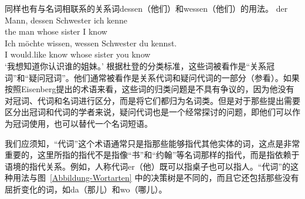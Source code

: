 同样也有与名词相联系的关系词dessen（他们）和wessen（他们）的用法。
\eal
\ex 
\gll der Mann, dessen Schwester ich kenne\\
	 the man whose sister I know\\
\ex 
\gll Ich möchte wissen, wessen Schwester du kennst.\\
	 I would.like know whose sister you know\\
\glt `我想知道你认识谁的姐妹。'
\zl
根据杜登的分类标准，这些词被看作是“关系冠词”和“疑问冠词”。他们通常被看作是关系代词和疑问代词的一部分（参看）。如果按照Eisenberg提出的术语来看，这些词的归类问题是不具有争议的，因为他没有对冠词、代词和名词进行区分，而是将它们都归为名词类。但是对于那些提出需要区分出冠词和代词的学者来说，疑问代词也是一个经常探讨的问题，即他们可以作为冠词使用，也可以替代一个名词短语。

我们应须知，“代词”这个术语通常只是指那些能够指代其他实体的词，这点是非常重要的，这里所指的指代不是指像“书”和“约翰”等名词那样的指代，而是指依赖于语境的指代关系。例如，人称代词er（他）既可以指桌子也可以指人。“代词”的这种用法与图~\ref{Abbildung-Wortarten} 中的决策树是不同的，而且它还包括那些没有屈折变化的词，如da（那儿）和wo（哪儿）。

